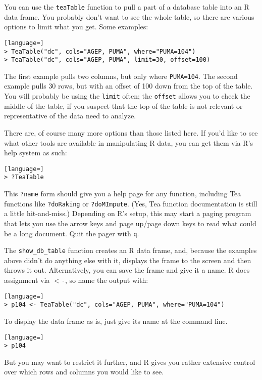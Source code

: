 \documentclass{article}
\begin{document}
You can use the {\tt teaTable} function to pull a part of a database table into
an R data frame. You probably don't want to see the whole table, so there are
various options to limit what you get. Some examples:
\begin{lstlisting}[language=]
> TeaTable("dc", cols="AGEP, PUMA", where="PUMA=104")
> TeaTable("dc", cols="AGEP, PUMA", limit=30, offset=100)
\end{lstlisting}

The first example pulls two columns, but only where {\tt PUMA=104}. The second
example pulls 30 rows, but with an offset of 100 down from the top of the
table. You will probably be using the {\tt limit} often; the {\tt offset} allows
you to check the middle of the table, if you suspect that the top of the table
is not relevant or representative of the data need to analyze.

There are, of course many more options than those listed here. If you'd like to see what other tools are available in manipulating R data, you can get them via R's help system as such:
\begin{lstlisting}[language=]
> ?TeaTable
\end{lstlisting}

This {\tt ?name} form should give you a help page for any function, including Tea
functions like {\tt ?doRaking} or {\tt ?doMImpute}. (Yes, Tea function documentation is still a
little hit-and-miss.) Depending on R's setup, this may start a paging program that lets 
you use the arrow keys and page up/page down keys to read what could be a long document. 
Quit the pager with {\tt q}.

The {\tt show\_db\_table} function creates an R data frame, and, because the examples above didn't do
anything else with it, displays the frame to the screen and then throws it out. Alternatively, you can
save the frame and give it a name. R does assignment via {\tt $<$-}, so name the output
with:

\begin{lstlisting}[language=]
> p104 <- TeaTable("dc", cols="AGEP, PUMA", where="PUMA=104")
\end{lstlisting}

To display the data frame as is, just give its name at the command line.

\begin{lstlisting}[language=]
> p104
\end{lstlisting}

But you may want to restrict it further, and R gives you rather extensive control over
which rows and columns you would like to see.
\end{document}
